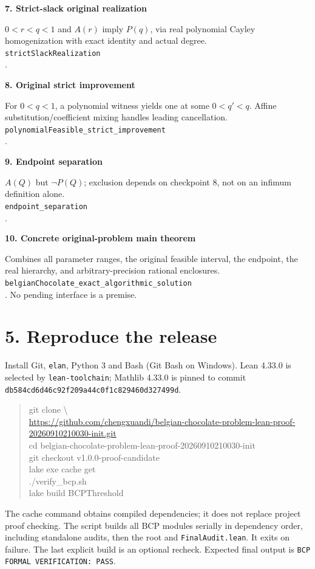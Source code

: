 \documentclass[10pt,a4paper]{article}
\newcommand{\decl}[1]{{\small\texttt{#1}}}
\newcommand{\itemhead}[2]{\par\medskip\textbf{#1. #2}\par}
\begin{document}
\itemhead{7}{Strict-slack original realization}
$0<r<q<1$ and $A(r)$ imply $P(q)$, via real polynomial Cayley
homogenization with exact identity and actual degree.\\
\decl{strictSlackRealization}\\
.

\itemhead{8}{Original strict improvement}
For $0<q<1$, a polynomial witness yields one at some $0<q'<q$.
Affine substitution/coefficient mixing handles leading cancellation.\\
\decl{polynomialFeasible\_strict\_improvement}\\
.

\itemhead{9}{Endpoint separation}
$A(Q)$ but $\neg P(Q)$; exclusion depends on checkpoint 8, not on
an infimum definition alone.\\
\decl{endpoint\_separation}\\
.

\itemhead{10}{Concrete original-problem main theorem}
Combines all parameter ranges, the original feasible interval, the endpoint,
the real hierarchy, and arbitrary-precision rational enclosures.\\
\decl{belgianChocolate\_exact\_algorithmic\_solution}\\
. No pending interface is a premise.

\par\endgroup
\newpage
\section*{5. Reproduce the release}
Install Git, \texttt{elan}, Python 3 and Bash (Git Bash on Windows).
Lean 4.33.0 is selected by \texttt{lean-toolchain}; Mathlib 4.33.0 is pinned
to commit \texttt{db584cd6d46c92f209a44c0f1c829460d327499d}.
\begin{quote}\footnotesize\ttfamily
git clone \textbackslash\\
\url{https://github.com/chengxuandi/belgian-chocolate-problem-lean-proof-20260910210030-init.git}\\
cd belgian-chocolate-problem-lean-proof-20260910210030-init\\
git checkout v1.0.0-proof-candidate\\
lake exe cache get\\
./verify\_bcp.sh\\
lake build BCPThreshold
\end{quote}
The cache command obtains compiled dependencies; it does not replace project
proof checking. The script builds all BCP modules serially in dependency order,
including standalone audits, then the root and \texttt{FinalAudit.lean}.
It exits on failure. The last explicit build is an optional recheck.
Expected final output is \texttt{BCP FORMAL VERIFICATION: PASS}.
\end{document}
